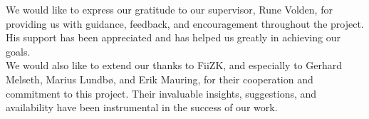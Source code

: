We would like to express our gratitude to our supervisor, Rune Volden, for providing us with guidance, feedback, and encouragement throughout the project. His support has been appreciated and has helped us greatly in achieving our goals. \\

\noindent
We would also like to extend our thanks to FiiZK, and especially to Gerhard Melseth, Marius Lundbø, and Erik Mauring, for their cooperation and commitment to this project. Their invaluable insights, suggestions, and availability have been instrumental in the success of our work. 
